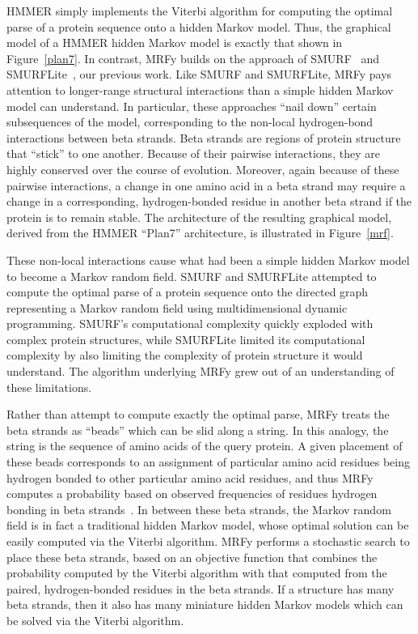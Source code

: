 \documentclass[preprint,nonatbib,blockstyle,nocopyrightspace,times]{sigplanconf}
\let\cite\citep
\begin{document}
HMMER simply implements the Viterbi algorithm for computing the optimal parse 
of a protein sequence onto a hidden Markov model.
Thus, the graphical model of 
a HMMER hidden Markov model is exactly that shown in Figure~\ref{plan7}.
In 
contrast, MRFy builds on the approach of SMURF~\cite{smurf} and 
SMURFLite~\cite{smurflite}, our previous work.
Like SMURF and SMURFLite, MRFy 
pays attention to longer-range structural interactions than a simple hidden 
Markov model can understand.
In particular, these approaches ``nail down'' 
certain subsequences of the model, corresponding to the non-local hydrogen-bond 
interactions between beta strands.
Beta strands are regions of protein 
structure that ``stick'' to one another.
Because of their pairwise 
interactions, they are highly conserved over the course of evolution.
Moreover, 
again because of these pairwise interactions, a change in one amino acid in a 
beta strand may require a change in a corresponding, hydrogen-bonded residue in 
another beta strand if the protein is to remain stable.
The architecture of the 
resulting graphical model, derived from the HMMER ``Plan7'' architecture, is 
illustrated in Figure~\ref{mrf}.

These non-local interactions cause what had been a simple hidden Markov model 
to become a Markov random field.
SMURF and SMURFLite attempted to compute the 
optimal parse of a protein sequence onto the directed graph representing a 
Markov random field using multidimensional dynamic programming.
SMURF's 
computational complexity quickly exploded with complex protein structures, 
while SMURFLite limited its computational complexity by also limiting the 
complexity of protein structure it would understand.
The algorithm underlying 
MRFy grew out of an understanding of these limitations.


Rather than attempt to compute exactly the optimal parse, MRFy treats the beta 
strands as ``beads'' which can be slid along a string.
In this analogy, the 
string is the sequence of amino acids of the query protein.
A given placement 
of these beads corresponds to an assignment of particular amino acid residues 
being hydrogen bonded to other particular amino acid residues, and thus MRFy 
computes a probability based on observed frequencies of residues hydrogen 
bonding in beta strands~\cite{betawrappro}.
In between these beta strands, the 
Markov random field is in fact a traditional hidden Markov model, whose optimal 
solution can be easily computed via the Viterbi algorithm.
MRFy performs a 
stochastic search to place these beta strands, based on an objective function 
that combines the probability computed by the Viterbi algorithm with that 
computed from the paired, hydrogen-bonded residues in the beta strands.
If a 
structure has many beta strands, then it also has many miniature hidden Markov 
models which can be solved via the Viterbi algorithm.
\end{document}
